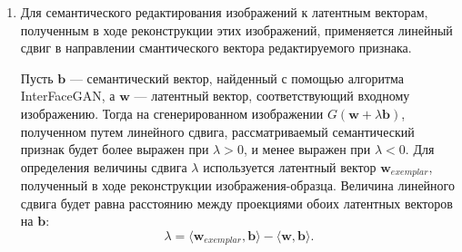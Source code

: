\begin{enumerate}
\begin{figure}[h]
\begin{center}
    \texttt{[image: optim\_pipeline\_ru]}
    \caption{Нейросетевая архитектура латентной оптимизации}
    \label{fig:optim_pipeline}
\end{center}
\end{figure}

Минимизация функции потерь реконструкции производится путем итеративного обновления латентного вектора с помощью метода градиентного спуска (рис. \ref{fig:optim_pipeline}).
Текущий латентный вектор подается на вход генератору сети StyleGAN.
По сгенерированному изображению и целевому изображению вычисляется значение функции потерь реконструкции. Метод обратного распространения ошибки позволяет распространить градиент через генератор, тем самым получив значение градиента функции потерь по входному вектору. Затем производится шаг градиентного спуска и обновление текущего латентного вектора.
Процесс латентной оптимизации останавливается по достижении максимального количества итераций.

Оптимизация латентного вектора производится в расширенном пространстве $\mathcal W+$.

Оптимизация производится с использованием фреймворка PyTorch, для ускорения сходимости используется оптимизационный алгоритм Adam.

\item
Для семантического редактирования изображений к латентным векторам, полученным в ходе реконструкции этих изображений, применяется линейный сдвиг в направлении смантического вектора редактируемого признака.

Пусть $\mathbf b$ --- семантический вектор, найденный с помощью алгоритма InterFaceGAN, а $\mathbf w$ --- латентный вектор, соответствующий входному изображению.
Тогда на сгенерированном изображении $G(\mathbf w + \lambda \mathbf b)$, полученном путем линейного сдвига, рассматриваемый семантический признак будет более выражен при $\lambda > 0$, и менее выражен при $\lambda  < 0$.
Для определения величины сдвига $\lambda$ используется латентный вектор $\mathbf w_{exemplar}$, полученный в ходе реконструкции изображения-образца. 
Величина линейного сдвига будет равна расстоянию между проекциями обоих латентных векторов на $\mathbf b$: 
$$\lambda = \langle \mathbf w_{exemplar}, \mathbf b \rangle - \langle \mathbf w, \mathbf b \rangle .$$


\end{enumerate}
